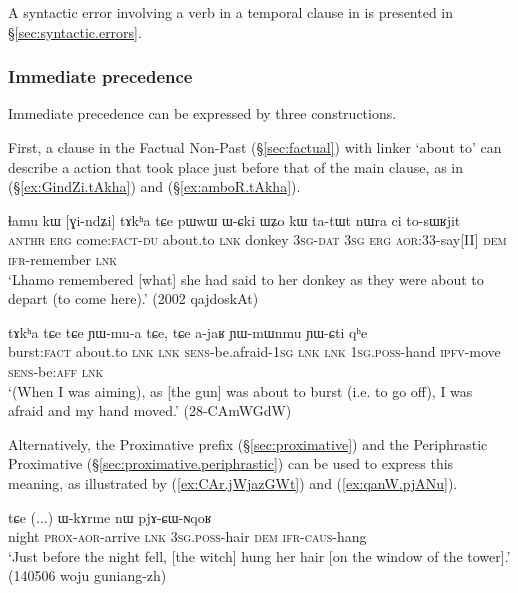 A syntactic error involving a verb in a temporal clause in   is presented in §\ref{sec:syntactic.errors}.

 \subsubsection{Immediate precedence}
Immediate precedence can be expressed by three constructions.

First, a clause in the Factual Non-Past (§\ref{sec:factual}) with linker  `about to' can describe a action that took place just before that of the main clause, as in (§\ref{ex:GindZi.tAkha}) and (§\ref{ex:amboR.tAkha}).
 
\begin{exe}
\ex \label{ex:GindZi.tAkha}
\gll ɬamu kɯ [ɣi-ndʑi] tɤkʰa tɕe pɯwɯ ɯ-ɕki ɯʑo kɯ ta-tɯt nɯra ci to-sɯʁjit \\
\textsc{anthr} \textsc{erg} come:\textsc{fact}-\textsc{du} about.to \textsc{lnk} donkey \textsc{3sg}-\textsc{dat} \textsc{3sg} \textsc{erg} \textsc{aor}:3\fl{}3-say[II] \textsc{dem} \textsc{ifr}-remember \textsc{lnk} \\
\glt  `Lhamo remembered [what] she had said to her donkey as they were about to depart (to come here).' (2002 qajdoskAt)
\end{exe}

\begin{exe}
\ex \label{ex:amboR.tAkha}
\gll [amboʁ] tɤkʰa tɕe tɕe ɲɯ-mu-a tɕe, tɕe a-jaʁ ɲɯ-mɯnmu ɲɯ-ɕti qʰe  \\
burst:\textsc{fact}  about.to \textsc{lnk}  \textsc{lnk} \textsc{sens}-be.afraid-\textsc{1sg}  \textsc{lnk}  \textsc{lnk} \textsc{1sg}.\textsc{poss}-hand \textsc{ipfv}-move \textsc{sens}-be:\textsc{aff} \textsc{lnk} \\
\glt  `(When I was aiming), as [the gun] was about to burst (i.e. to go off), I was afraid and my hand moved.' (28-CAmWGdW)
\end{exe}


Alternatively, the  Proximative prefix (§\ref{sec:proximative}) and the Periphrastic Proximative (§\ref{sec:proximative.periphrastic}) can be used to express this meaning, as illustrated by (\ref{ex:CAr.jWjazGWt}) and (\ref{ex:qanW.pjANu}).


\begin{exe}
\ex \label{ex:CAr.jWjazGWt}
 tɕe (...) ɯ-kɤrme nɯ pjɤ-ɕɯ-ɴqoʁ \\
night \textsc{prox}-\textsc{aor}-arrive \textsc{lnk} { } \textsc{3sg}.\textsc{poss}-hair \textsc{dem} \textsc{ifr}-\textsc{caus}-hang \\
\glt `Just before the night fell, [the witch] hung her hair [on the window of the tower].' (140506 woju guniang-zh)
\end{exe}


